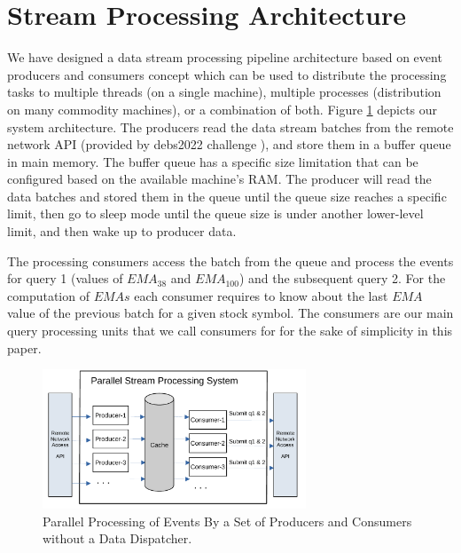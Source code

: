 \section{Stream Processing Architecture}\label{sec:concepts}
We have designed a data stream processing pipeline architecture based on event producers and consumers concept which can be used to distribute
the processing tasks to multiple threads (on a single machine), multiple processes (distribution on many commodity machines), or a combination of both. 
Figure \ref{fig:parallel-srream-processing1} depicts our system architecture. The producers read the data stream batches from the remote 
network API (provided by debs2022 challenge \cite{debs2022challenge}), and store them in a buffer queue in main memory. 
The buffer queue has a specific size limitation that can be configured based 
on the available machine's RAM. The producer will read the data batches and stored them in the queue until the queue size reaches a specific limit, then 
go to sleep mode until the queue size is under another lower-level limit, and then wake up to producer data. 

The processing consumers access the batch from the queue and process the events for query 1 (values of $EMA_{38}$ and $EMA_{100}$) 
and the subsequent query 2. For the computation of $EMAs$ each consumer requires to know about the last $EMA$ value of the previous batch for a given stock symbol. 
The consumers are our main query processing units that we call consumers for for the sake of simplicity in this paper. 

\begin{figure}[!ht]
    \begin{center}
        \includegraphics[width=0.7\textwidth]{./images/Parallel-Stream-Processing-System_v1}
        \caption{Parallel Processing of Events By a Set of Producers and Consumers without a Data Dispatcher.}
        \label{fig:parallel-srream-processing1}
    \end{center}
\end{figure}


